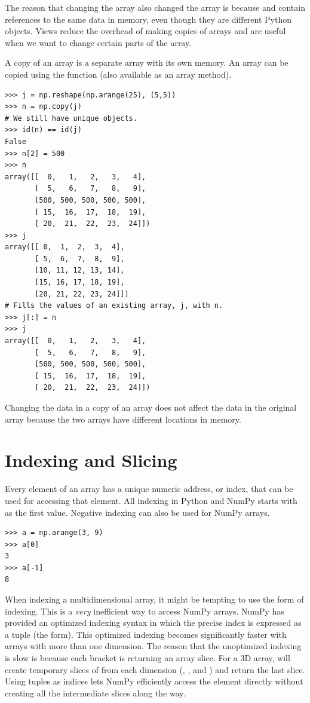 The reason that changing the array  also changed
the array  is because  and  contain references to the
same data in memory, even though they are different Python objects.
Views reduce the overhead of making copies of arrays and are useful when
we want to change certain parts of the array.

A copy of an array is a separate array with its own memory. An array can
be copied using the  function (also available as an array
method). 

\begin{lstlisting}
>>> j = np.reshape(np.arange(25), (5,5))
>>> n = np.copy(j) 
# We still have unique objects.
>>> id(n) == id(j) 
False
>>> n[2] = 500 
>>> n
array([[  0,   1,   2,   3,   4],
       [  5,   6,   7,   8,   9],
       [500, 500, 500, 500, 500],
       [ 15,  16,  17,  18,  19],
       [ 20,  21,  22,  23,  24]])
>>> j
array([[ 0,  1,  2,  3,  4],
       [ 5,  6,  7,  8,  9],
       [10, 11, 12, 13, 14],
       [15, 16, 17, 18, 19],
       [20, 21, 22, 23, 24]])
# Fills the values of an existing array, j, with n.
>>> j[:] = n
>>> j
array([[  0,   1,   2,   3,   4],
       [  5,   6,   7,   8,   9],
       [500, 500, 500, 500, 500],
       [ 15,  16,  17,  18,  19],
       [ 20,  21,  22,  23,  24]])
\end{lstlisting} 
Changing the data in a copy of an array does not affect the data in the 
original array because the two arrays have different locations in memory.

\section*{Indexing and Slicing} Every element of an array has a unique
numeric address, or index, that can be used for accessing that element.
All indexing in Python and NumPy starts with  as the first value. 
Negative indexing can also be used for NumPy arrays. 
\begin{lstlisting}
>>> a = np.arange(3, 9) 
>>> a[0]
3
>>> a[-1]
8 
\end{lstlisting} 
When indexing a multidimensional array, it might be
tempting to use the  form of indexing. This is a \emph{very}
inefficient way to access NumPy arrays. NumPy has provided an optimized
indexing syntax in which the precise index is expressed as a tuple (the
 form).  This optimized indexing becomes significantly
faster with arrays with more than one dimension. The reason that the
unoptimized indexing is slow is because each bracket is returning an
array slice. For a 3D array,  will create temporary
slices of  from each dimension (, , and
) and return the last slice. Using tuples as indices lets
NumPy efficiently access the element directly without creating all the
intermediate slices along the way.


